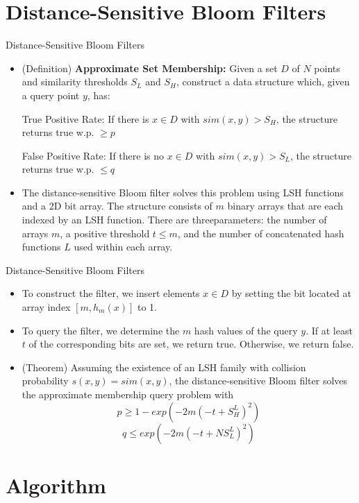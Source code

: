 \documentclass[Serif, 10pt, brown]{beamer}
\theoremstyle{example}
\theoremstyle{plain}
\begin{document}
\section{Distance-Sensitive Bloom Filters}
\begin{frame}{Distance-Sensitive Bloom Filters}
	\begin{itemize}
		\item (Definition) {\bf Approximate Set Membership:} Given a set $D$ of $N$ points and similarity thresholds
		$S_L$ and $S_H$, construct a data structure which, given a query point $y$, has:

		True Positive Rate: If there is $x \in D$ with $sim(x,y) >S_H$, the structure returns true w.p. $ \geq p$

		False Positive Rate: If there is no $x \in D$ with $sim(x,y) > S_L$, the structure returns true w.p. $\leq q$

	\item The distance-sensitive Bloom filter solves this problem using LSH functions and a 2D bit array. The structure consists of $m$ binary arrays that are each indexed by an LSH function. There are threeparameters: the number of arrays $m$, a positive threshold $t \leq m$, and the number of concatenated hash functions $L$ used within each array.  
	\end{itemize}
\end{frame}

\begin{frame}{Distance-Sensitive Bloom Filters}
	\begin{itemize}
		\item To construct the filter, we insert elements $x \in D$ by setting the bit located at array index $[m,h_m(x)]$ to 1. 
		\item To query the filter, we determine the $m$ hash values of the query $y$. If at least $t$ of the corresponding
		bits are set, we return true. Otherwise, we return false. 
		\item (Theorem) Assuming the existence of an LSH family with collision probability $s(x,y) = sim(x,y)$,
		the distance-sensitive Bloom filter solves the approximate membership query problem with
		\[p \geq 1 - exp\left(-2m(-t + S_H^L)^2\right)\]
		\[q \leq exp\left(-2m(-t + NS_L^L)^2\right)\]
	\end{itemize}
\end{frame}

\section{Algorithm}
\end{document}
